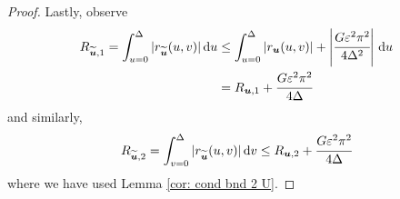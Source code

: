 \begin{proof}
	Lastly, observe 
	\begin{align*}
		R_{\widetilde{\boldsymbol u},1} = \int_{u=0}^\Delta |r_{\widetilde{\boldsymbol u}} (u,v) |\, \mathrm{d} u 
		&\leq \int_{u=0}^\Delta \left|r_{\boldsymbol u} (u,v) \right| + \left|\cfrac{G \varepsilon^2 \pi^2}{4\Delta^2}\right| \, \mathrm{d} u
		\\& = R_{{{\boldsymbol u}},1} + \cfrac{G \varepsilon^2 \pi^2}{4\Delta}
	\end{align*}
	and similarly, 
	\[R_{\widetilde{\boldsymbol u},2} = \int_{v=0}^\Delta |r_{\widetilde{\boldsymbol u}} (u,v) |\, \mathrm{d} v \leq R_{{\boldsymbol u},2} + \cfrac{G \varepsilon^2 \pi^2}{4\Delta}\]
	where we have used Lemma \ref{cor: cond bnd 2 U}. 
\end{proof}

